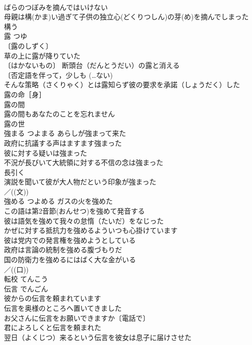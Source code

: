 \documentclass[8pt]{extreport}
\begin{document}
\begin{CJK}{UTF8}{min}
\\	ばらのつぼみを摘んではいけない 
\\	母親は構(かま)い過ぎて子供の独立心(どくりつしん)の芽(め)を摘んでしまった 
\\	構う　
\\	露	つゆ	
\\	〔露のしずく〕
\\	草の上に露が降りていた 
\\	〔はかないもの〕 断頭台（だんとうだい）の露と消える 
\\	〔否定語を伴って，少しも (…ない) 
\\	そんな策略（さくりゃく）とは露知らず彼の要求を承諾（しょうだく）した 
\\	露の命［身］ 
\\	露の間　
\\	露の間もあなたのことを忘れません 
\\	露の世 
\\	強まる	つよまる	あらしが強まって来た 
\\	政府に抗議する声はますます強まった 
\\	彼に対する疑いは強まった 
\\	不況が長びいて大統領に対する不信の念は強まった 
\\	長引く　
\\	演説を聞いて彼が大人物だという印象が強まった 
\\	／((文))
\\	強める	つよめる	ガスの火を強めた 
\\	この語は第2音節(おんせつ)を強めて発音する 
\\	彼は語気を強めて我々の怠惰（たいだ）をなじった 
\\	かぜに対する抵抗力を強めるよういつも心掛けています 
\\	彼は党内での発言権を強めようとしている 
\\	政府は言論の統制を強める腹づもりだ 
\\	国の防衛力を強めるにはばく大な金がいる 
\\	／((口))
\\	転校	てんこう	
\\	伝言	でんごん	
\\	彼からの伝言を頼まれています 
\\	伝言を奥様のところへ置いてきました 
\\	お父さんに伝言をお願いできますか〔電話で〕 
\\	君によろしくと伝言を頼まれた 
\\	翌日（よくじつ）来るという伝言を彼女は息子に届けさせた 

\end{CJK}
\end{document}
